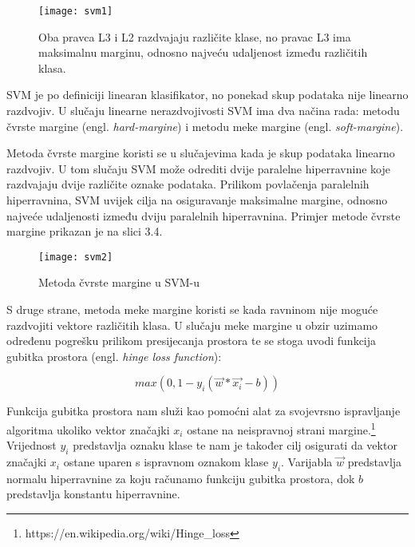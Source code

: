 \documentclass[times, utf8, zavrsni]{fer}
\begin{document}
\begin{figure}[h]
	\centering
	\texttt{[image: svm1]}
	\caption{Oba pravca L3 i L2 razdvajaju različite klase, no pravac L3 ima maksimalnu marginu, odnosno najveću udaljenost između različitih klasa.\protect\footnotemark}
\end{figure}


\newpage


SVM je po definiciji linearan klasifikator, no ponekad skup podataka nije linearno razdvojiv. U slučaju linearne nerazdvojivosti SVM ima dva načina rada: metodu čvrste margine (engl. \textit{hard-margine}) i metodu meke margine (engl. \textit{soft-margine}).

Metoda čvrste margine koristi se u slučajevima kada je skup podataka linearno razdvojiv. U tom slučaju SVM može odrediti dvije paralelne hiperravnine koje razdvajaju dvije različite oznake podataka. Prilikom povlačenja paralelnih hiperravnina, SVM uvijek cilja na osiguravanje maksimalne margine, odnosno najveće udaljenosti između dviju paralelnih hiperravnina. Primjer metode čvrste margine prikazan je na slici 3.4.\newline

\begin{figure}[h]
	\centering
	\texttt{[image: svm2]}
	\caption{Metoda čvrste margine u SVM-u \protect\footnotemark}
\end{figure}


S druge strane, metoda meke margine koristi se kada ravninom nije moguće razdvojiti vektore različitih klasa. U slučaju meke margine u obzir uzimamo određenu pogrešku prilikom presijecanja prostora te se stoga uvodi funkcija gubitka prostora (engl. \textit{hinge loss function}):

\begin{equation}
	max(0,1-y_{i}(\overrightarrow{w} * \overrightarrow{x_{i}} - b))
\end{equation}

Funkcija gubitka prostora nam služi kao pomoćni alat za svojevrsno ispravljanje algoritma ukoliko vektor značajki $x_{i}$ ostane na neispravnoj strani margine.\footnote{https://en.wikipedia.org/wiki/Hinge\_loss} Vrijednost $y_{i}$ predstavlja oznaku klase te nam je također cilj osigurati da vektor značajki $x_{i}$ ostane uparen s ispravnom oznakom klase $y_{i}$. Varijabla $\overrightarrow{w}$ predstavlja normalu hiperravnine za koju računamo funkciju gubitka prostora, dok $b$ predstavlja konstantu hiperravnine.
\end{document}
